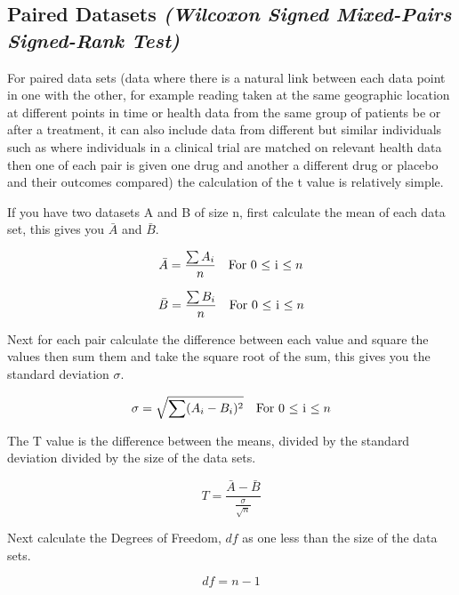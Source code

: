 \subsection{Paired Datasets \emph{(Wilcoxon Signed Mixed-Pairs Signed-Rank Test)}}
For paired data sets (data where there is a natural link between each data point in one with the other, for example reading taken at the same geographic location at different points in time or health data from the same group of patients be or after a treatment, it can also include data from different but similar individuals such as where individuals in a clinical trial are matched on relevant health data then one of each pair is given one drug and another a different drug or placebo and their outcomes compared) the calculation of the t value is relatively simple.

If you have two datasets A and B of size n, first calculate the mean of each data set, this gives you $\bar A$ and $\bar B$. 


\begin{equation}
    \bar A = \frac{\sum A_i}{n} \text{\quad For 0 $\leq$ i $\leq n$}
\end{equation}

\begin{equation}
\bar B = \frac{\sum B_i}{n} \text{\quad For 0 $\leq$ i $\leq n$}
\end{equation}

Next for each pair calculate the difference between each value and square the values then sum them and take the square root of the sum, this gives you the standard deviation $\sigma$.

\begin{equation}
    \sigma = \sqrt{\sum (A_i - B_i)^2} \text{\quad For 0 $\leq$ i $\leq n$}
\end{equation}

The T value is the difference between the means, divided by the standard deviation divided by the size of the data sets.

\begin{equation}
    T = \frac{\bar A - \bar B}{\frac{\sigma}{\sqrt n}}
\end{equation}

Next calculate the Degrees of Freedom, $df$ as one less than the size of the data sets.

\begin{equation}
    df = n - 1
\end{equation}



